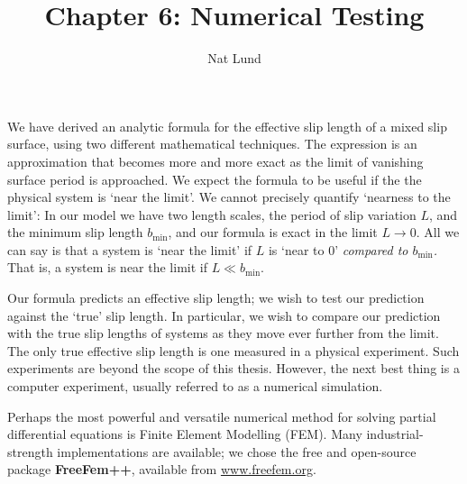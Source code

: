 \documentclass[a4paper]{report}
\title{Chapter 6: Numerical Testing}
\author{Nat Lund}
\newcommand{\bmin}{\ensuremath{b_{\mathrm{min}}}}
\begin{document}
\maketitle

We have derived an analytic formula for the effective slip length of a mixed slip surface, using two different mathematical techniques.  The expression is an approximation that becomes more and more exact as the limit of vanishing surface period is approached.  We expect the formula to be useful if the the physical system is `near the limit'.
We cannot precisely quantify `nearness to the limit': In our model we have two length scales, the period of slip variation $L$, and the minimum slip length $\bmin$, and our formula is exact in the limit $L \to 0$.  All we can say is that a system is `near the limit' if $L$ is `near to 0' \emph{compared to $\bmin$.} That is, a system is near the limit if $L \ll \bmin$.

Our formula predicts an effective slip length; we wish to test our prediction against the `true' slip length. In particular, we wish to compare our prediction with the true slip lengths of systems as they move ever further from the limit.  The only true effective slip length is one measured in a physical experiment.  Such experiments are beyond the scope of this thesis.  However, the next best thing is a computer experiment, usually referred to as a numerical simulation.

Perhaps the most powerful and versatile numerical method for solving partial differential equations is Finite Element Modelling (FEM).  Many industrial-strength implementations are available; we chose the free and open-source package \textbf{FreeFem++}, available from \url{www.freefem.org}.
\end{document}
